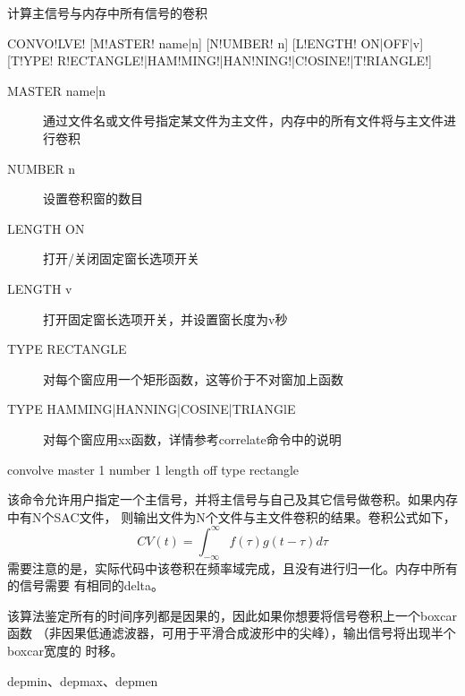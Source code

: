 \label{cmd:convolve}

计算主信号与内存中所有信号的卷积

\begin{SACSTX}
CONVO!LVE! [M!ASTER! name|n] [N!UMBER! n] [L!ENGTH! ON|OFF|v] 
    [T!YPE! R!ECTANGLE!|HAM!MING!|HAN!NING!|C!OSINE!|T!RIANGLE!]
\end{SACSTX}

\begin{description}
\item [MASTER name|n] 通过文件名或文件号指定某文件为主文件，内存中的所有文件将与主文件进行卷积
\item [NUMBER n] 设置卷积窗的数目
\item [LENGTH ON] 打开/关闭固定窗长选项开关
\item [LENGTH v] 打开固定窗长选项开关，并设置窗长度为v秒
\item [TYPE RECTANGLE] 对每个窗应用一个矩形函数，这等价于不对窗加上函数
\item [TYPE HAMMING|HANNING|COSINE|TRIANGlE] 对每个窗应用xx函数，详情参考correlate命令中的说明
\end{description}

\begin{SACDFT}
convolve master 1 number 1 length off type rectangle
\end{SACDFT}

该命令允许用户指定一个主信号，并将主信号与自己及其它信号做卷积。如果内存中有N个SAC文件，
则输出文件为N个文件与主文件卷积的结果。卷积公式如下，
	\[ CV(t) = \int_{-\infty} ^\infty f(\tau)g(t-\tau)d\tau \]
需要注意的是，实际代码中该卷积在频率域完成，且没有进行归一化。内存中所有的信号需要
有相同的delta。

该算法鉴定所有的时间序列都是因果的，因此如果你想要将信号卷积上一个boxcar函数
（非因果低通滤波器，可用于平滑合成波形中的尖峰），输出信号将出现半个boxcar宽度的
时移。

depmin、depmax、depmen
